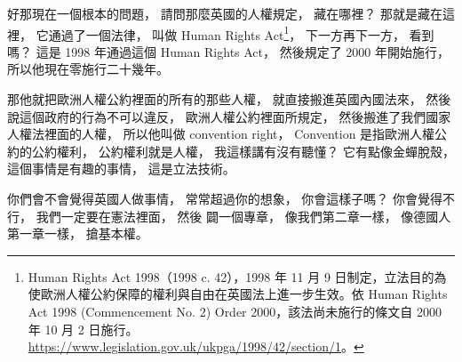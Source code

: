 \hypertarget{w06:cue:720}{}好那現在一個根本的問題，
\hypertarget{w06:cue:721}{}請問那麼英國的人權規定，
\hypertarget{w06:cue:722}{}藏在哪裡？
\hypertarget{w06:cue:723}{}那就是藏在這裡，
\hypertarget{w06:cue:724}{}它通過了一個法律，
\hypertarget{w06:cue:725}{}叫做 Human Rights Act\footnote{Human Rights Act 1998（1998 c. 42），1998 年 11 月 9 日制定，立法目的為使歐洲人權公約保障的權利與自由在英國法上進一步生效。依 Human Rights Act 1998 (Commencement No. 2) Order 2000，該法尚未施行的條文自 2000 年 10 月 2 日施行。\url{https://www.legislation.gov.uk/ukpga/1998/42/section/1}。}，
\hypertarget{w06:cue:726}{}下一方再下一方，
\hypertarget{w06:cue:727}{}看到嗎？
\hypertarget{w06:cue:728}{}這是 1998 年通過這個 Human Rights Act，
\hypertarget{w06:cue:729}{}然後規定了 2000 年開始施行，
\hypertarget{w06:cue:730}{}所以他現在零施行二十幾年。

\hypertarget{w06:cue:731}{}那他就把歐洲人權公約裡面的所有的那些人權，
\hypertarget{w06:cue:732}{}就直接搬進英國內國法來，
\hypertarget{w06:cue:733}{}然後說這個政府的行為不可以違反，
\hypertarget{w06:cue:734}{}歐洲人權公約裡面所規定，
\hypertarget{w06:cue:735}{}然後搬進了我們國家人權法裡面的人權，
\hypertarget{w06:cue:736}{}所以他叫做 convention right，
\hypertarget{w06:cue:737}{}Convention 是指歐洲人權公約的公約權利，
\hypertarget{w06:cue:738}{}公約權利就是人權，
\hypertarget{w06:cue:739}{}我這樣講有沒有聽懂？
\hypertarget{w06:cue:740}{}它有點像金蟬脫殼，
\hypertarget{w06:cue:741}{}這個事情是有趣的事情，
\hypertarget{w06:cue:742}{}這是立法技術。

\hypertarget{w06:cue:743}{}你們會不會覺得英國人做事情，
\hypertarget{w06:cue:744}{}常常超過你的想象，
\hypertarget{w06:cue:745}{}你會這樣子嗎？
\hypertarget{w06:cue:746}{}你會覺得不行，
\hypertarget{w06:cue:747}{}我們一定要在憲法裡面，
\hypertarget{w06:cue:748}{}然後 闢一個專章，
\hypertarget{w06:cue:749}{}像我們第二章一樣，
\hypertarget{w06:cue:750}{}像德國人第一章一樣，
\hypertarget{w06:cue:751}{}搶基本權。

